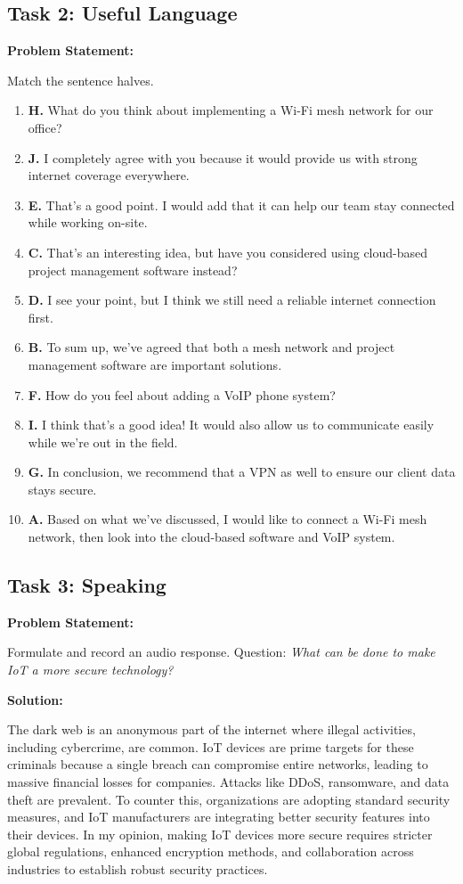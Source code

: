 \documentclass[a4paper,12pt]{article}
\begin{document}
\vspace{1cm}

\subsection{Task 2: Useful Language}
\textbf{Problem Statement:}

Match the sentence halves.

\begin{enumerate}
    \item \textbf{H.} What do you think about implementing a Wi-Fi mesh network for our office?
    \item \textbf{J.} I completely agree with you because it would provide us with strong internet coverage everywhere.
    \item \textbf{E.} That’s a good point. I would add that it can help our team stay connected while working on-site.
    \item \textbf{C.} That’s an interesting idea, but have you considered using cloud-based project management software instead?
    \item \textbf{D.} I see your point, but I think we still need a reliable internet connection first.
    \item \textbf{B.} To sum up, we’ve agreed that both a mesh network and project management software are important solutions.
    \item \textbf{F.} How do you feel about adding a VoIP phone system?
    \item \textbf{I.} I think that’s a good idea! It would also allow us to communicate easily while we’re out in the field.
    \item \textbf{G.} In conclusion, we recommend that a VPN as well to ensure our client data stays secure.
    \item \textbf{A.} Based on what we’ve discussed, I would like to connect a Wi-Fi mesh network, then look into the cloud-based software and VoIP system.
\end{enumerate}

\vspace{1cm}

\subsection{Task 3: Speaking}
\textbf{Problem Statement:}

Formulate and record an audio response. Question: \textit{What can be done to make IoT a more secure technology?}

\textbf{Solution:}

The dark web is an anonymous part of the internet where illegal activities, including cybercrime, are common. IoT devices are prime targets for these criminals because a single breach can compromise entire networks, leading to massive financial losses for companies. Attacks like DDoS, ransomware, and data theft are prevalent. To counter this, organizations are adopting standard security measures, and IoT manufacturers are integrating better security features into their devices. In my opinion, making IoT devices more secure requires stricter global regulations, enhanced encryption methods, and collaboration across industries to establish robust security practices.
\end{document}
